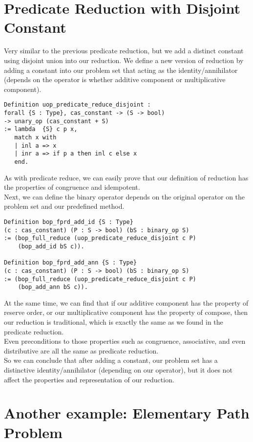 \documentclass[a4paper,12pt,twoside,openright]{report}
\begin{document}
\section{Predicate Reduction with Disjoint Constant}
Very similar to the previous predicate reduction, but we add a distinct constant using disjoint union into our reduction. We define a new version of reduction by adding a constant into our problem set that acting as the identity/annihilator (depends on the operator is whether additive component or multiplicative component).
\begin{lstlisting}
Definition uop_predicate_reduce_disjoint : 
forall {S : Type}, cas_constant -> (S -> bool) 
-> unary_op (cas_constant + S)
:= lambda  {S} c p x,
   match x with     
   | inl a => x
   | inr a => if p a then inl c else x
   end.
\end{lstlisting}
As with predicate reduce, we can easily prove that our definition of reduction has the properties of congruence and idempotent.\\
Next, we can define the binary operator depends on the original operator on the problem set and our predefined method.
\begin{lstlisting}
Definition bop_fprd_add_id {S : Type} 
(c : cas_constant) (P : S -> bool) (bS : binary_op S) 
:= (bop_full_reduce (uop_predicate_reduce_disjoint c P) 
	(bop_add_id bS c)).

Definition bop_fprd_add_ann {S : Type} 
(c : cas_constant) (P : S -> bool) (bS : binary_op S) 
:= (bop_full_reduce (uop_predicate_reduce_disjoint c P) 
	(bop_add_ann bS c)).
\end{lstlisting}
At the same time, we can find that if our additive component has the property of reserve order, or our multiplicative component has the property of compose, then our reduction is traditional, which is exactly the same as we found in the predicate reduction.\\
Even preconditions to those properties such as congruence, associative, and even distributive are all the same as predicate reduction.\\
So we can conclude that after adding a constant, our problem set has a distinctive identity/annihilator (depending on our operator), but it does not affect the properties and representation of our reduction. 



\section{Another example: Elementary Path Problem}
\end{document}
